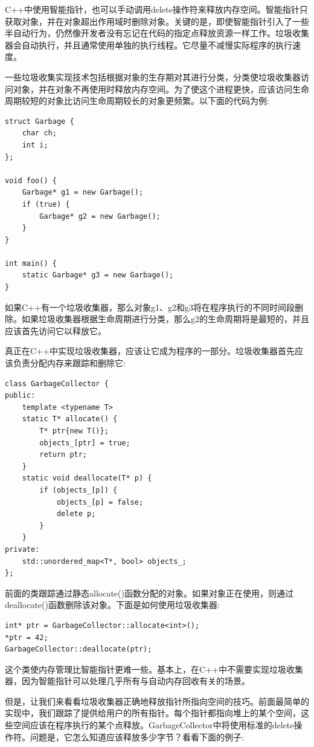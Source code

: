 C++中使用智能指针，也可以手动调用delete操作符来释放内存空间。智能指针只获取对象，并在对象超出作用域时删除对象。关键的是，即使智能指针引入了一些半自动行为，仍然像开发者没有忘记在代码的指定点释放资源一样工作。垃圾收集器会自动执行，并且通常使用单独的执行线程。它尽量不减慢实际程序的执行速度。\par
一些垃圾收集实现技术包括根据对象的生存期对其进行分类，分类使垃圾收集器访问对象，并在对象不再使用时释放内存空间。为了使这个进程更快，应该访问生命周期较短的对象比访问生命周期较长的对象更频繁。以下面的代码为例: \par

\begin{lstlisting}[caption={}]
struct Garbage {
	char ch;
	int i;
};

void foo() {
	Garbage* g1 = new Garbage();
	if (true) {
		Garbage* g2 = new Garbage();
	}
}

int main() {
	static Garbage* g3 = new Garbage();
}
\end{lstlisting}

如果C++有一个垃圾收集器，那么对象g1、g2和g3将在程序执行的不同时间段删除。如果垃圾收集器根据生命周期进行分类，那么g2的生命周期将是最短的，并且应该首先访问它以释放它。 \par
真正在C++中实现垃圾收集器，应该让它成为程序的一部分。垃圾收集器首先应该负责分配内存来跟踪和删除它: \par

\begin{lstlisting}[caption={}]
class GarbageCollector {
public:
	template <typename T>
	static T* allocate() {
		T* ptr{new T()};
		objects_[ptr] = true;
		return ptr;
	}
	static void deallocate(T* p) {
		if (objects_[p]) {
			objects_[p] = false;
			delete p;
		}
	}
private:
	std::unordered_map<T*, bool> objects_;
};
\end{lstlisting}

前面的类跟踪通过静态allocate()函数分配的对象。如果对象正在使用，则通过deallocate()函数删除该对象。下面是如何使用垃圾收集器: \par

\begin{lstlisting}[caption={}]
int* ptr = GarbageCollector::allocate<int>();
*ptr = 42;
GarbageCollector::deallocate(ptr);
\end{lstlisting}

这个类使内存管理比智能指针更难一些。基本上，在C++中不需要实现垃圾收集器，因为智能指针可以处理几乎所有与自动内存回收有关的场景。 \par
但是，让我们来看看垃圾收集器正确地释放指针所指向空间的技巧。前面最简单的实现中，我们跟踪了提供给用户的所有指针。每个指针都指向堆上的某个空间，这些空间应该在程序执行的某个点释放。GarbageCollector中将使用标准的delete操作符。问题是，它怎么知道应该释放多少字节？看看下面的例子: \par


